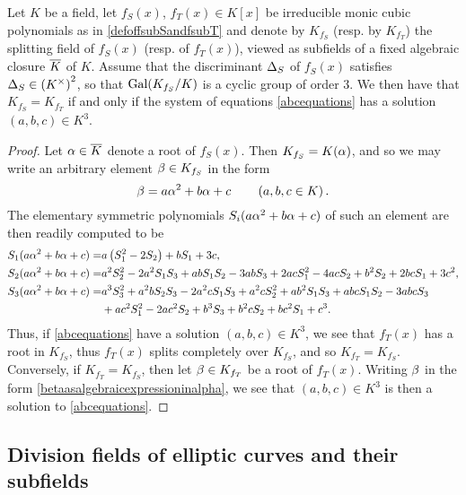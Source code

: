 \begin{lemma} \label{settingcubicfieldsequaltoeachotherlemma}
Let $K$ be a field, let $f_S(x)$, $f_T(x) \in K[x]$ be irreducible monic cubic polynomials as in \eqref{defoffsubSandfsubT} and denote by $K_{f_S}$ (resp. by $K_{f_T}$) the splitting field of $f_S(x)$ (resp. of $f_T(x)$), viewed as subfields of a fixed algebraic closure $\overline{K}$ of $K$.  Assume that the discriminant $\Delta_S$ of $f_S(x)$ satisfies $\Delta_S \in \left( K^\times \right)^2$, so that $\operatorname{Gal}(K_{f_S}/K)$ is a cyclic group of order $3$. We then have that $K_{f_S} = K_{f_T}$ if and only if the system of equations \eqref{abcequations} has a solution $(a,b,c) \in K^3$.
\end{lemma}
\begin{proof}
Let $\alpha \in \overline{K}$ denote a root of $f_S(x)$.  Then $K_{f_S} = K(\alpha)$, and so we may write an arbitrary element $\beta \in K_{f_S}$ in the form
\begin{equation} \label{betaasalgebraicexpressioninalpha}
\beta = a \alpha^2 + b\alpha + c \quad\quad \left( a, b, c \in K \right).
\end{equation}
The elementary symmetric polynomials $S_i(a \alpha^2 + b\alpha + c)$ of such an element are then readily computed to be
\begin{equation} \label{symmetricpolynomialequalities}
\begin{split}
S_1(a \alpha^2 + b\alpha + c) = &a \left( S_1^2 - 2S_2 \right) + b S_1 + 3c, \\
S_2(a \alpha^2 + b\alpha + c) = &a^2 S_2^2 - 2a^2 S_1 S_3 + ab S_1 S_2 - 3abS_3 + 2acS_1^2 - 4acS_2 + b^2 S_2 + 2bc S_1 + 3c^2, \\
S_3(a \alpha^2 + b\alpha + c) = &a^3 S_3^2 + a^2b S_2 S_3 - 2a^2c S_1 S_3 + a^2c S_2^2 + ab^2 S_1 S_3 + abc S_1 S_2 - 3abc S_3 \\
&+ ac^2 S_1^2 - 2ac^2 S_2 + b^3 S_3 + b^2 c S_2 + bc^2 S_1 + c^3.
\end{split}
\end{equation}
Thus, if \eqref{abcequations} have a solution $(a,b,c) \in K^3$, we see that $f_T(x)$ has a root in $K_{f_S}$, thus $f_T(x)$ splits completely over $K_{f_S}$, and so $K_{f_T} = K_{f_S}$.  Conversely, if $K_{f_T} = K_{f_S}$, then let $\beta \in K_{f_T}$ be a root of $f_T(x)$.  Writing $\beta$ in the form \eqref{betaasalgebraicexpressioninalpha}, we see that $(a,b,c) \in K^3$ is then a solution to \eqref{abcequations}.
\end{proof}

\subsection{Division fields of elliptic curves and their subfields} \label{divisionfieldssubsection}

